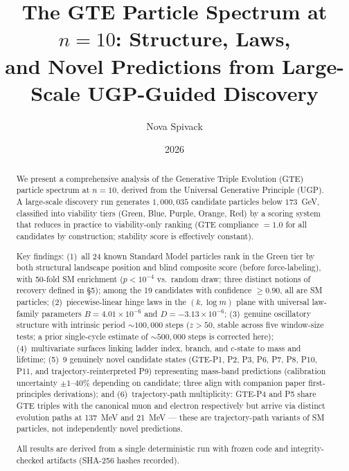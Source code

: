 \documentclass[12pt]{article}
\title{The GTE Particle Spectrum at $n{=}10$: Structure, Laws,\\
and Novel Predictions from Large-Scale UGP-Guided Discovery}
\author[1]{Nova Spivack}
\date{2026}
\numberwithin{equation}{section}
\begin{document}
\maketitle
\NovaZenodoAfterTitle

\begin{abstract}
We present a comprehensive analysis of the Generative Triple Evolution (GTE) particle spectrum at $n{=}10$, derived from the Universal Generative Principle (UGP). A large-scale discovery run generates $1{,}000{,}035$ candidate particles below $173$~GeV, classified into viability tiers (Green, Blue, Purple, Orange, Red) by a scoring system that reduces in practice to viability-only ranking (GTE compliance $= 1.0$ for all candidates by construction; stability score is effectively constant).

Key findings: (1)~all 24 known Standard Model particles rank in the Green tier by both structural landscape position and blind composite score (before force-labeling), with 50-fold SM enrichment ($p < 10^{-4}$ vs.\ random draw; three distinct notions of recovery defined in \S5); among the 19 candidates with confidence $\geq 0.90$, all are SM particles; (2)~piecewise-linear hinge laws in the $(k, \log m)$ plane with universal law-family parameters $B = 4.01 \times 10^{-6}$ and $D = -3.13 \times 10^{-6}$; (3)~genuine oscillatory structure with intrinsic period ${\sim}\!100{,}000$ steps ($z{>}50$, stable across five window-size tests; a prior single-cycle estimate of ${\sim}500{,}000$ steps is corrected here); (4)~multivariate surfaces linking ladder index, branch, and $c$-state to mass and lifetime; (5)~9 genuinely novel candidate states (GTE-P1, P2, P3, P6, P7, P8, P10, P11, and trajectory-reinterpreted P9) representing mass-band predictions (calibration uncertainty $\pm 1\text{--}40\%$ depending on candidate; three align with companion paper first-principles derivations); and (6)~trajectory-path multiplicity: GTE-P4 and P5 share GTE triples with the canonical muon and electron respectively but arrive via distinct evolution paths at 137~MeV and 21~MeV --- these are trajectory-path variants of SM particles, not independently novel predictions.

All results are derived from a single deterministic run with frozen code and integrity-checked artifacts (SHA-256 hashes recorded).
\end{abstract}

\setcounter{tocdepth}{2}
\tableofcontents
\bigskip

\end{document}
